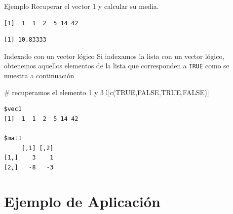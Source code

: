 \documentclass[
  ignorenonframetext,
  aspectratio=169,
  spanish,
]{beamer}
\newenvironment{Shaded}{\begin{snugshade}}{\end{snugshade}}
\newcommand{\CommentTok}[1]{\textcolor[rgb]{0.37,0.37,0.37}{#1}}
\newcommand{\ConstantTok}[1]{\textcolor[rgb]{0.56,0.35,0.01}{#1}}
\newcommand{\FunctionTok}[1]{\textcolor[rgb]{0.28,0.35,0.67}{#1}}
\newcommand{\NormalTok}[1]{\textcolor[rgb]{0.00,0.23,0.31}{#1}}
\newcommand{\SpecialCharTok}[1]{\textcolor[rgb]{0.37,0.37,0.37}{#1}}
\begin{document}
\begin{frame}[fragile]{Ejemplo}
\label{ejemplo-1}
Recuperar el vector 1 y calcular su media.

\begin{Shaded}
\end{Shaded}

\begin{verbatim}
[1]  1  1  2  5 14 42
\end{verbatim}

\begin{Shaded}
\end{Shaded}

\begin{verbatim}
[1] 10.83333
\end{verbatim}
\end{frame}

\begin{frame}[fragile]{Indexado con un vector lógico}
\label{indexado-con-un-vector-luxf3gico}
Si indexamos la lista con un vector lógico, obtenemos aquellos elementos
de la lista que corresponden a \texttt{TRUE} como se muestra a
continuación

\begin{Shaded}
\begin{Highlighting}[]
\CommentTok{\# recuperamos el elemento 1 y 3 }
\NormalTok{l[}\FunctionTok{c}\NormalTok{(}\ConstantTok{TRUE}\NormalTok{,}\ConstantTok{FALSE}\NormalTok{,}\ConstantTok{TRUE}\NormalTok{,}\ConstantTok{FALSE}\NormalTok{)]}
\end{Highlighting}
\end{Shaded}

\begin{verbatim}
$vec1
[1]  1  1  2  5 14 42

$mat1
     [,1] [,2]
[1,]    3    1
[2,]   -8   -3
\end{verbatim}
\end{frame}

\section{Ejemplo de Aplicación}\label{ejemplo-de-aplicaciuxf3n}
\end{document}
